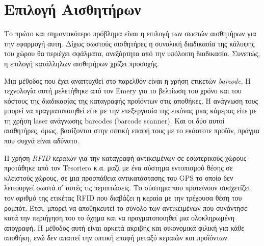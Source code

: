 \section{Επιλογή Αισθητήρων}
\label{section:sensor_selection}


Το πρώτο και σημαντικότερο πρόβλημα είναι η επιλογή των σωστών αισθητήρων για την εφαρμογή αυτη. Δίχως σωστούς αισθητήρες η συνολική διαδικασία της κάλυψης του χώρου θα περιέχει σφάλματα, ανεξάρτητα από την υπόλοιπη διαδικασία. Συνεπώς, η επιλογή κατάλληλων αισθητήρων χρίζει προσοχής. 

Μια μέθοδος που έχει αναπτυχθεί στο παρελθόν είναι η χρήση ετικετών \emph{barcode}. Η τεχνολογία αυτή μελετήθηκε από τον Emery \cite{barcodes} για το βελτίωση του χρόνο και του κόστους της διαδικασίας της καταγραφής προϊόντων στις αποθήκες. Η ανάγνωση τους μπορεί να πραγματοποιηθεί είτε με την επεξεργασία της εικόνας μιας κάμερας είτε με τη χρήση laser ανάγνωσης barcodes (barcode scanner). Και οι δύο αυτοί αισθητήρες, όμως, βασίζονται στην οπτική επαφή τους με το εκάστοτε προϊόν, πράγμα που συχνά είναι αδύνατο.

Η χρήση \emph{RFID κεραιών} για την καταγραφή αντικειμένων σε εσωτερικούς χώρους προτάθηκε από τον Tesoriero κ.α. \cite{tesoriero2009} μαζί με ένα σύστημα εντοπισμού θέσης σε κλειστούς χώρους, σε μια προσπάθεια αντικατάστασης του GPS το οποίο δεν λειτουργεί σωστά σ' αυτές τις περιπτώσεις. Το σύστημα που προτείνουν συσχετίζει τον αριθμό της ετικέτας RFID που διαβάζει η κεραία με την τρέχουσα θέση του ρομπότ. Έτσι, μπορεί να αποθηκευτεί το σύνολο των αντικειμένων που συνάντησε κατά την περιήγηση του το όχημα και να πραγματοποιηθεί μια ολοκληρωμένη απογραφή. Η μέθοδος αυτή είναι αρκετά ακριβής και οικονομικά φιλική για κάθε αποθήκη, ενώ δεν απαιτεί την οπτική επαφή μεταξύ κεραιών και προϊόντων. 
